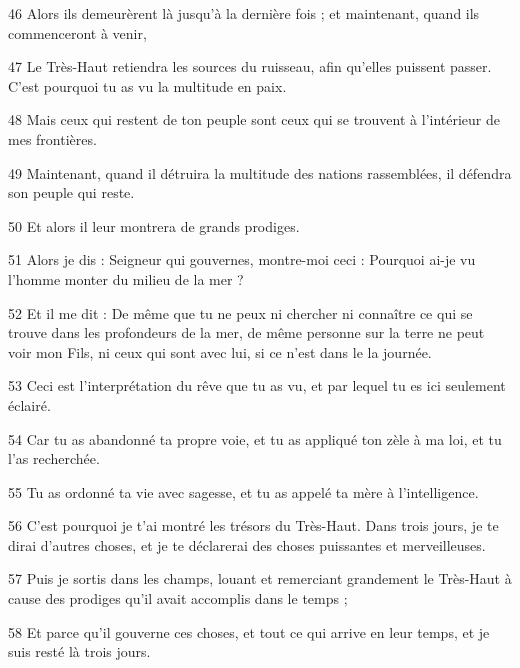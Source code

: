 \par 46 Alors ils demeurèrent là jusqu'à la dernière fois ; et maintenant, quand ils commenceront à venir,
\par 47 Le Très-Haut retiendra les sources du ruisseau, afin qu'elles puissent passer. C'est pourquoi tu as vu la multitude en paix.
\par 48 Mais ceux qui restent de ton peuple sont ceux qui se trouvent à l'intérieur de mes frontières.
\par 49 Maintenant, quand il détruira la multitude des nations rassemblées, il défendra son peuple qui reste.
\par 50 Et alors il leur montrera de grands prodiges.
\par 51 Alors je dis : Seigneur qui gouvernes, montre-moi ceci : Pourquoi ai-je vu l'homme monter du milieu de la mer ?
\par 52 Et il me dit : De même que tu ne peux ni chercher ni connaître ce qui se trouve dans les profondeurs de la mer, de même personne sur la terre ne peut voir mon Fils, ni ceux qui sont avec lui, si ce n'est dans le la journée.
\par 53 Ceci est l'interprétation du rêve que tu as vu, et par lequel tu es ici seulement éclairé.
\par 54 Car tu as abandonné ta propre voie, et tu as appliqué ton zèle à ma loi, et tu l'as recherchée.
\par 55 Tu as ordonné ta vie avec sagesse, et tu as appelé ta mère à l'intelligence.
\par 56 C'est pourquoi je t'ai montré les trésors du Très-Haut. Dans trois jours, je te dirai d'autres choses, et je te déclarerai des choses puissantes et merveilleuses.
\par 57 Puis je sortis dans les champs, louant et remerciant grandement le Très-Haut à cause des prodiges qu'il avait accomplis dans le temps ;
\par 58 Et parce qu'il gouverne ces choses, et tout ce qui arrive en leur temps, et je suis resté là trois jours.


